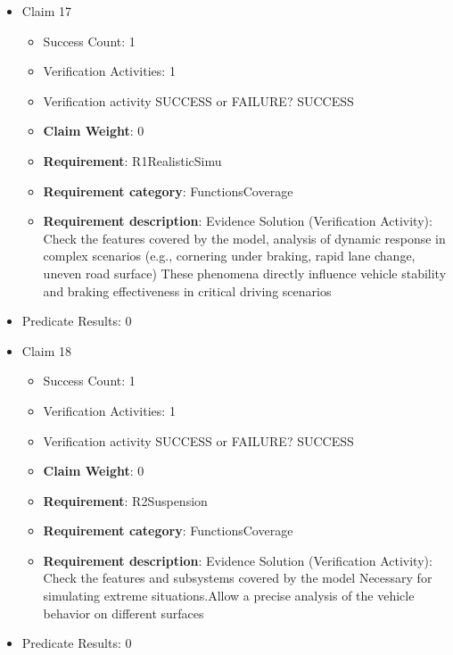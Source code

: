 \documentclass{article}
\begin{document}
\begin{itemize}
  				  \item Claim 17
				\begin{itemize}
			    	\item Success Count: 1 
			    	\item Verification Activities: 1
					\item Verification activity SUCCESS or FAILURE? SUCCESS
					\item \textbf{Claim Weight}: 0
						\item \textbf{Requirement}: R1RealisticSimu 
						\item \textbf{Requirement category}: FunctionsCoverage 
						\item \textbf{Requirement description}: Evidence Solution (Verification Activity): Check the features covered by the model, analysis of dynamic response in complex scenarios (e.g., cornering under braking, rapid lane change, uneven road surface)  These phenomena directly influence vehicle stability and braking effectiveness in critical driving scenarios
					
				\end{itemize}
				
									    
				\item Predicate Results: 0

  				  \item Claim 18
				\begin{itemize}
			    	\item Success Count: 1 
			    	\item Verification Activities: 1
					\item Verification activity SUCCESS or FAILURE? SUCCESS
					\item \textbf{Claim Weight}: 0
						\item \textbf{Requirement}: R2Suspension 
						\item \textbf{Requirement category}: FunctionsCoverage 
						\item \textbf{Requirement description}: Evidence Solution (Verification Activity): Check the features and subsystems covered by the model Necessary for simulating extreme situations.Allow a precise analysis of the vehicle behavior on different surfaces
					
				\end{itemize}
				
									    
				\item Predicate Results: 0


\end{itemize}
\end{document}
